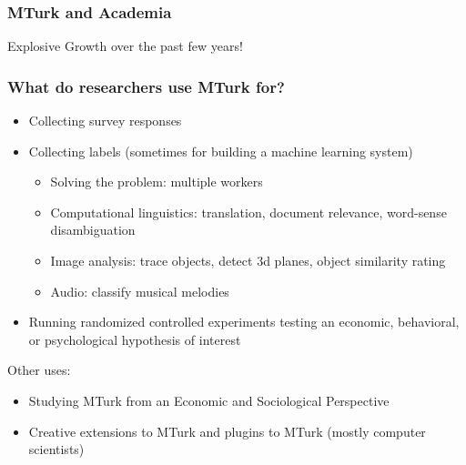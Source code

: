 \documentclass[slides]{beamer} %
\begin{document}
\begin{frame}\frametitle{MTurk and Academia}


\vspace{-0.5cm}
\centering
Explosive Growth over the past few years!

\end{frame}

\begin{frame}\frametitle{What do researchers use MTurk for?}
 \pause
\small


\vspace{-0.2cm}
\begin{itemize}

\item Collecting survey responses \pause
\item Collecting labels (sometimes for building a machine learning system) \pause
\vspace{-0.5cm}
\begin{itemize}
\item Solving the  problem: multiple workers \pause
\item Computational linguistics: translation, document relevance, word-sense disambiguation \pause
\item Image analysis: trace objects, detect 3d planes, object similarity rating \pause
\item Audio: classify musical melodies \pause
\end{itemize}
\item Running randomized controlled experiments testing an economic, behavioral, or psychological hypothesis of interest \pause
\end{itemize}

\vspace{-0.15cm}
Other uses:
\vspace{-0.15cm}
\begin{itemize}
\item Studying MTurk from an Economic and Sociological Perspective \pause
\item Creative extensions to MTurk and plugins to MTurk (mostly computer scientists)
\end{itemize}



\end{frame}
\end{document}
